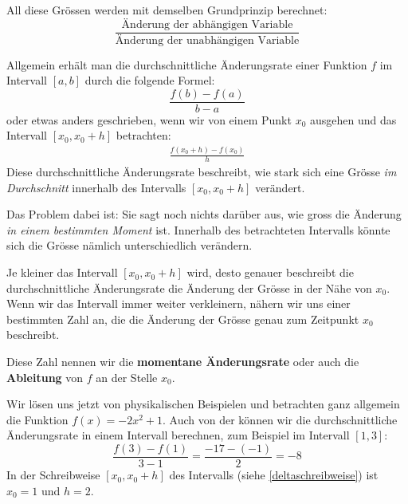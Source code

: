 All diese Grössen werden mit demselben Grundprinzip berechnet:
\[
    \frac{\text{Änderung der abhängigen Variable}}{\text{Änderung der unabhängigen Variable}}
\]

Allgemein erhält man die durchschnittliche Änderungsrate einer Funktion $f$ im Intervall $[a, b]$ durch die folgende Formel:
\[
    \frac{f(b)-f(a)}{b-a}
\]
oder etwas anders geschrieben, wenn wir von einem Punkt $x_0$ ausgehen und das Intervall $[x_0, x_0 + h]$ betrachten:
\begin{align}
    \label{deltaschreibweise}
    \frac{f(x_0+h)-f(x_0)}{h}
\end{align}
Diese durchschnittliche Änderungsrate beschreibt, wie stark sich eine Grösse \emph{im Durchschnitt} innerhalb des Intervalls $[x_0, x_0 + h]$ verändert.

Das Problem dabei ist:
Sie sagt noch nichts darüber aus, wie gross die Änderung \emph{in einem bestimmten Moment} ist. Innerhalb des betrachteten Intervalls könnte sich die Grösse nämlich unterschiedlich verändern.

Je kleiner das Intervall $[x_0, x_0 + h]$ wird, desto genauer beschreibt die durchschnittliche Änderungsrate die Änderung der Grösse in der Nähe von $x_0$. Wenn wir das Intervall immer weiter verkleinern, nähern wir uns einer bestimmten Zahl an, die die Änderung der Grösse genau zum Zeitpunkt $x_0$ beschreibt.

Diese Zahl nennen wir die \textbf{momentane Änderungsrate} oder auch die \textbf{Ableitung} von $f$ an der Stelle $x_0$.

\begin{example}
    Wir lösen uns jetzt von physikalischen Beispielen und betrachten ganz allgemein die Funktion $f(x)=-2x^2+1$. Auch von der können wir die durchschnittliche Änderungsrate in einem Intervall berechnen, zum Beispiel im Intervall $[1, 3]$:
    $$\frac{f(3)-f(1)}{3-1}=\frac{-17 - (-1)}{2}=-8$$
    In der Schreibweise $[x_0,x_0+h]$ des Intervalls (siehe \eqref{deltaschreibweise}) ist $x_0=1$ und $h =2$.
\end{example}


